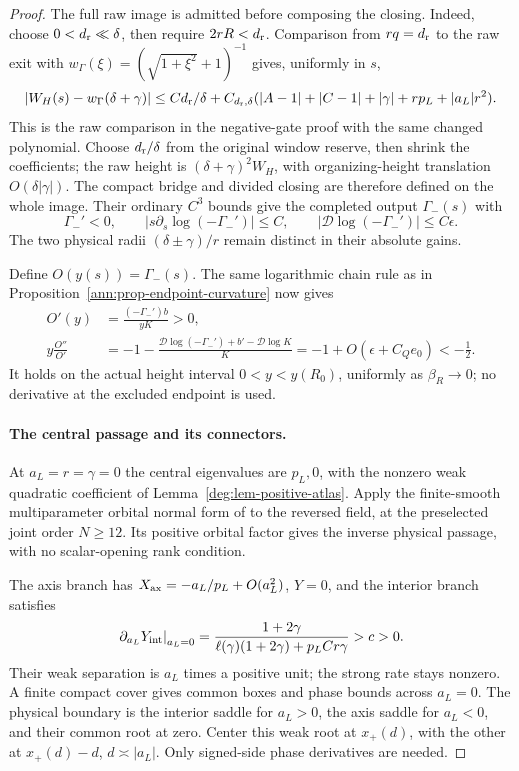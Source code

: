 \begin{proof}
The full raw image is admitted before composing the closing. Indeed,
choose \(0<d_{\rm r}\ll\delta\), then require \(2rR<d_{\rm r}\).
Comparison from \(rq=d_{\rm r}\) to the raw exit with
\(w_\Gamma(\xi)=(\sqrt{1+\xi^2}+1)^{-1}\) gives, uniformly in \(s\),
\[
 |W_H(s)-w_\Gamma(\delta+\gamma)|
 \le C d_{\rm r}/\delta+
 C_{d_{\rm r},\delta}(|A-1|+|C-1|+|\gamma|+rp_L+|a_L|r^2).
\]
This is the raw comparison in the negative-gate proof with the same
changed polynomial. Choose \(d_{\rm r}/\delta\) from the original
window reserve, then shrink the coefficients; the raw height is
\((\delta+\gamma)^2W_H\), with organizing-height translation
\(O(\delta|\gamma|)\). The compact bridge and divided closing are
therefore defined on the whole image. Their ordinary \(C^3\) bounds
give the completed output \(\Gamma_-(s)\) with
\[
 \Gamma_-'<0,\qquad
 |s\partial_s\log(-\Gamma_-')|\le C,\qquad
 |\mathcal D\log(-\Gamma_-')|\le C\epsilon.
\]
The two physical radii \((\delta\pm\gamma)/r\) remain distinct in
their absolute gains.

Define \(O(y(s))=\Gamma_-(s)\). The same logarithmic chain rule as
in Proposition~\ref{ann:prop-endpoint-curvature} now gives
\begin{equation}\label{deg:trace-extra-saddle}
 \begin{split}
 O'(y)&=\frac{(-\Gamma_-')b}{yK}>0,\\
 y\frac{O''}{O'}
 &=-1-\frac{\mathcal D\log(-\Gamma_-')+b'-\mathcal D\log K}{K}
 =-1+O(\epsilon+C_Qe_0)<-\tfrac12.
 \end{split}
\end{equation}
It holds on the actual height interval \(0<y<y(R_0)\), uniformly
as \(\beta_R\to0\); no derivative at the excluded endpoint is used.

\paragraph{The central passage and its connectors.}
At \(a_L=r=\gamma=0\) the central eigenvalues are \(p_L,0\),
with the nonzero weak quadratic coefficient of
Lemma~\ref{deg:lem-positive-atlas}. Apply the finite-smooth
multiparameter orbital normal form of
\cite[Theorem~3 and formula~(2.2), October 2000 author copy p.~6]{DIR02}
to the reversed field, at the preselected joint order \(N\ge12\).
Its positive orbital factor gives the inverse physical passage, with
no scalar-opening rank condition.

The axis branch has \(X_{\rm ax}=-a_L/p_L+O(a_L^2)\), \(Y=0\),
and the interior branch satisfies
\[
 \left.\partial_{a_L}Y_{\rm int}\right|_{a_L=0}
 =\frac{1+2\gamma}
 {\ell(\gamma)(1+2\gamma)+p_LCr\gamma}>c>0.
\]
Their weak separation is \(a_L\) times a positive unit; the strong
rate stays nonzero. A finite compact cover gives common boxes and phase
bounds across \(a_L=0\). The physical boundary is the interior saddle
for \(a_L>0\), the axis saddle for \(a_L<0\), and their common root
at zero. Center this weak root at \(x_+(d)\), with the other at
\(x_+(d)-d\), \(d\asymp|a_L|\). Only signed-side phase derivatives
are needed.


\end{proof}

